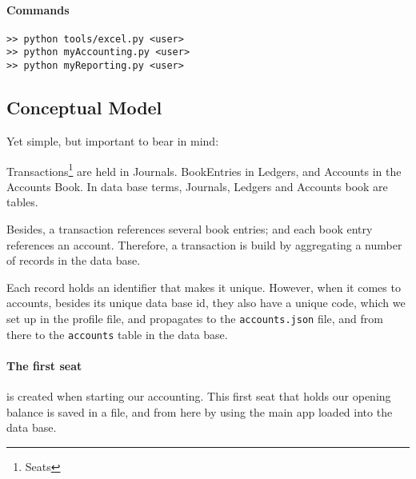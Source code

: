 \documentclass[12pt, a4paper]{article}
\begin{document}
 \paragraph{Commands}
 \begin{verbatim}
>> python tools/excel.py <user>
>> python myAccounting.py <user>
>> python myReporting.py <user>
\end{verbatim}

 \subsection{Conceptual Model}
 Yet simple, but important to bear in mind:
 
 Transactions\footnote{Seats} are held in Journals. BookEntries  in Ledgers, and Accounts in  the Accounts Book. In data base terms, Journals, Ledgers and Accounts book are tables.  
 
 Besides, a transaction references several book entries; and each book entry references an account.
 Therefore, a transaction is build by aggregating a number of  records in the data base.
 
 Each record holds an identifier that makes it unique. However, when it comes to accounts, besides its unique data base id, they also have a unique code, which we set up in the profile file, and propagates to the \verb!accounts.json! file, and from there to the \verb!accounts! table in the data base.
 
 \paragraph{The first seat} is created when starting our accounting. This first seat that holds our opening balance is saved in a file, and from here by using the main app loaded into the data base. 
  \begin{figure}[h]
 \centering
 \end{figure}
\end{document}

